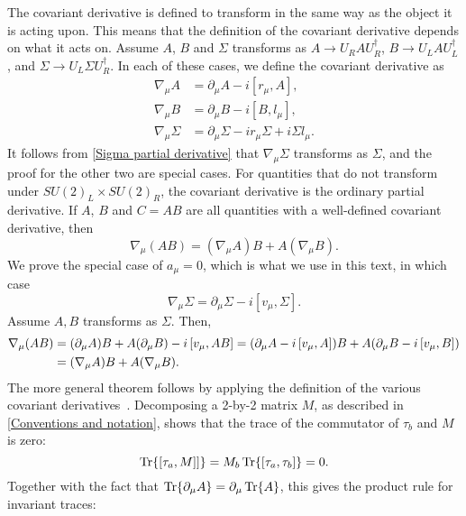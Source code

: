 The covariant derivative is defined to transform in the same way as the object it is acting upon.
This means that the definition of the covariant derivative depends on what it acts on.
Assume $A$, $B$ and $\Sigma$ transforms as $A \rightarrow U_R A U_R^\dagger$, $B \rightarrow U_L A U_L^\dagger$, and $\Sigma \rightarrow U_L \Sigma U_R^\dagger$.
In each of these cases, we define the covariant derivative as
\begin{align}
    \label{covariant derivative general}
    \nabla_\mu A &= \partial_\mu A - i [r_\mu, A], \\
    \nabla_\mu B &= \partial_\mu B - i [B, l_\mu], \\
    \nabla_\mu \Sigma &= \partial_\mu \Sigma - i r_\mu \Sigma + i \Sigma l_\mu.
\end{align}
It follows from \cref{Sigma partial derivative} that $\nabla_\mu \Sigma$ transforms as $\Sigma$, and the proof for the other two are special cases.
For quantities that do not transform under $SU(2)_L\times SU(2)_R$, the covariant derivative is the ordinary partial derivative.
If $A$, $B$ and $C = AB$ are all quantities with a well-defined covariant derivative, then
\begin{equation}
    \nabla_\mu (AB) = (\nabla_\mu A) B + A (\nabla_\mu B).
\end{equation}
We prove the special case of $a_\mu = 0$, which is what we use in this text, in which case
\begin{equation}
    \nabla_\mu \Sigma = \partial_\mu \Sigma - i [v_\mu, \Sigma].
\end{equation}
Assume $A, B$ transforms as $\Sigma$. 
Then,
\begin{align*}
    \nabla_\mu (A B)
    & = (\partial_\mu A) B + A (\partial_\mu B) - i \left[v_\mu, AB \right]
    = (\partial_\mu A - i \left[v_\mu, A \right])B + A(\partial_\mu B- i \left[v_\mu, B \right])\\
    & = (\nabla_\mu A)B + A (\nabla_\mu B).
\end{align*}
The more general theorem follows by applying the definition of the various covariant derivatives~\cite{Scherer:PhysRevD.53.315}.
Decomposing a 2-by-2 matrix $M$, as described in \autoref{Conventions and notation}, shows that the trace of the commutator of $\tau_b$ and $M$ is zero:
\begin{equation*}
    \Tr{\left[\tau_a, M \right]]} = M_b\Tr{ \left[\tau_a, \tau_b \right]} = 0.
\end{equation*}
Together with the fact that $\Tr{\partial_\mu A} = \partial_\mu \Tr{A}$, this gives the product rule for invariant traces:
